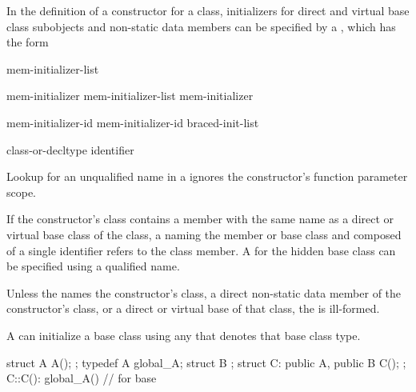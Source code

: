 \pnum
In the definition of a constructor for a class,
initializers for direct and virtual base class subobjects and
non-static data members can be specified by a
,
which has the form

\begin{bnf}
\br
    \terminal{:} mem-initializer-list
\end{bnf}

\begin{bnf}
\br
    mem-initializer \br
    mem-initializer-list \terminal{,} mem-initializer 
\end{bnf}

\begin{bnf}
\br
    mem-initializer-id \terminal{(}  \terminal{)}\br
    mem-initializer-id braced-init-list
\end{bnf}

\begin{bnf}
\br
    class-or-decltype\br
    identifier
\end{bnf}

\pnum
Lookup for an unqualified name in a 
ignores the constructor's function parameter scope.
\begin{note}
If the constructor's class contains a member with the same name as a direct
or virtual base class of the class, a
naming the member or base class and composed of a single identifier
refers to the class member.
A
for the hidden base class can be specified using a qualified name.
\end{note}
Unless the
names the constructor's class,
a direct non-static data member of the constructor's class, or
a direct or virtual base of that class,
the
is ill-formed.

\pnum
A
can initialize a base class using any  that denotes that base class type.
\begin{example}
\begin{codeblock}
struct A { A(); };
typedef A global_A;
struct B { };
struct C: public A, public B { C(); };
C::C(): global_A() { }          //  for base 
\end{codeblock}
\end{example}

